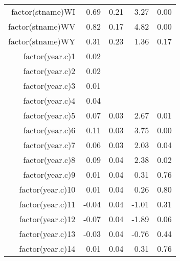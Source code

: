 \begin{table}[ht]
\begin{tabular}{rrrrr}
  factor(stname)WI & 0.69 & 0.21 & 3.27 & 0.00 \\ 
  factor(stname)WV & 0.82 & 0.17 & 4.82 & 0.00 \\ 
  factor(stname)WY & 0.31 & 0.23 & 1.36 & 0.17 \\ 
  factor(year.c)1 & 0.02 &  &  &  \\ 
  factor(year.c)2 & 0.02 &  &  &  \\ 
  factor(year.c)3 & 0.01 &  &  &  \\ 
  factor(year.c)4 & 0.04 &  &  &  \\ 
  factor(year.c)5 & 0.07 & 0.03 & 2.67 & 0.01 \\ 
  factor(year.c)6 & 0.11 & 0.03 & 3.75 & 0.00 \\ 
  factor(year.c)7 & 0.06 & 0.03 & 2.03 & 0.04 \\ 
  factor(year.c)8 & 0.09 & 0.04 & 2.38 & 0.02 \\ 
  factor(year.c)9 & 0.01 & 0.04 & 0.31 & 0.76 \\ 
  factor(year.c)10 & 0.01 & 0.04 & 0.26 & 0.80 \\ 
  factor(year.c)11 & -0.04 & 0.04 & -1.01 & 0.31 \\ 
  factor(year.c)12 & -0.07 & 0.04 & -1.89 & 0.06 \\ 
  factor(year.c)13 & -0.03 & 0.04 & -0.76 & 0.44 \\ 
  factor(year.c)14 & 0.01 & 0.04 & 0.31 & 0.76 \\ 
   \hline
\end{tabular}
\end{table}

